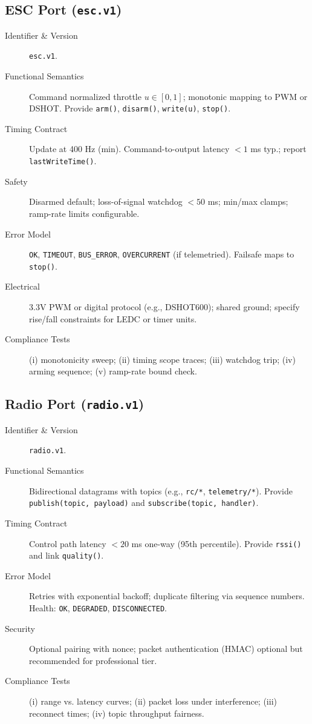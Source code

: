 \subsection{ESC Port (\texttt{esc.v1})}\label{subsec:esc-contract}
\begin{description}
\item[Identifier \& Version] \texttt{esc.v1}.
\item[Functional Semantics] Command normalized throttle $u\in[0,1]$; monotonic mapping to PWM or DSHOT. Provide \texttt{arm()}, \texttt{disarm()}, \texttt{write(u)}, \texttt{stop()}.
\item[Timing Contract] Update at 400 Hz (min). Command-to-output latency $<1$ ms typ.; report \texttt{lastWriteTime()}.
\item[Safety] Disarmed default; loss-of-signal watchdog $<50$ ms; min/max clamps; ramp-rate limits configurable.
\item[Error Model] \texttt{OK}, \texttt{TIMEOUT}, \texttt{BUS\_ERROR}, \texttt{OVERCURRENT} (if telemetried). Failsafe maps to \texttt{stop()}.
\item[Electrical] 3.3V PWM or digital protocol (e.g., DSHOT600); shared ground; specify rise/fall constraints for LEDC or timer units.
\item[Compliance Tests] (i) monotonicity sweep; (ii) timing scope traces; (iii) watchdog trip; (iv) arming sequence; (v) ramp-rate bound check.
\end{description}

\subsection{Radio Port (\texttt{radio.v1})}\label{subsec:radio-contract}
\begin{description}
\item[Identifier \& Version] \texttt{radio.v1}.
\item[Functional Semantics] Bidirectional datagrams with topics (e.g., \texttt{rc/*}, \texttt{telemetry/*}). Provide \texttt{publish(topic, payload)} and \texttt{subscribe(topic, handler)}.
\item[Timing Contract] Control path latency $<20$ ms one-way (95th percentile). Provide \texttt{rssi()} and link \texttt{quality()}.
\item[Error Model] Retries with exponential backoff; duplicate filtering via sequence numbers. Health: \texttt{OK}, \texttt{DEGRADED}, \texttt{DISCONNECTED}.
\item[Security] Optional pairing with nonce; packet authentication (HMAC) optional but recommended for professional tier.
\item[Compliance Tests] (i) range vs. latency curves; (ii) packet loss under interference; (iii) reconnect times; (iv) topic throughput fairness.
\end{description}

